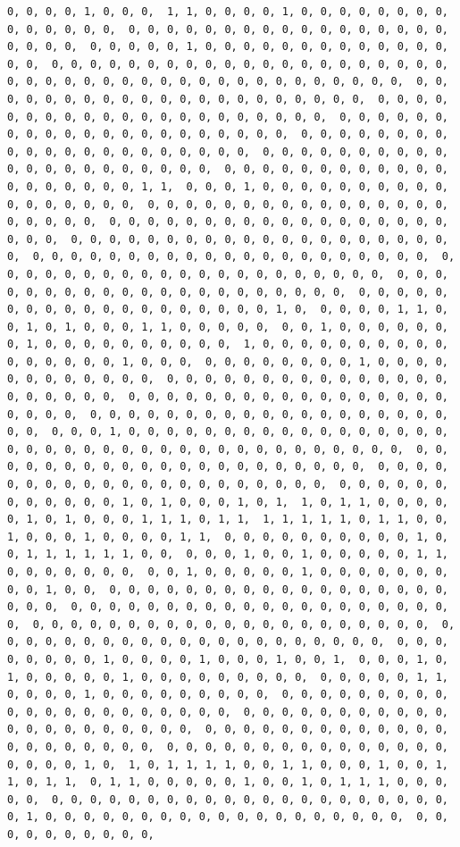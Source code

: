 \documentclass[
]{article}
\begin{document}
\begin{verbatim}
0, 0, 0, 0, 1, 0, 0, 0,  1, 1, 0, 0, 0, 0, 1, 0, 0, 0, 0, 0, 0, 0, 0, 0, 0, 0, 0, 0, 0,  0, 0, 0, 0, 0, 0, 0, 0, 0, 0, 0, 0, 0, 0, 0, 0, 0, 0, 0, 0, 0,  0, 0, 0, 0, 0, 1, 0, 0, 0, 0, 0, 0, 0, 0, 0, 0, 0, 0, 0, 0, 0,  0, 0, 0, 0, 0, 0, 0, 0, 0, 0, 0, 0, 0, 0, 0, 0, 0, 0, 0, 0, 0,  0, 0, 0, 0, 0, 0, 0, 0, 0, 0, 0, 0, 0, 0, 0, 0, 0, 0, 0, 0, 0,  0, 0, 0, 0, 0, 0, 0, 0, 0, 0, 0, 0, 0, 0, 0, 0, 0, 0, 0, 0, 0,  0, 0, 0, 0, 0, 0, 0, 0, 0, 0, 0, 0, 0, 0, 0, 0, 0, 0, 0, 0, 0,  0, 0, 0, 0, 0, 0, 0, 0, 0, 0, 0, 0, 0, 0, 0, 0, 0, 0, 0, 0, 0,  0, 0, 0, 0, 0, 0, 0, 0, 0, 0, 0, 0, 0, 0, 0, 0, 0, 0, 0, 0, 0,  0, 0, 0, 0, 0, 0, 0, 0, 0, 0, 0, 0, 0, 0, 0, 0, 0, 0, 0, 0, 0,  0, 0, 0, 0, 0, 0, 0, 0, 0, 0, 0, 0, 0, 0, 0, 0, 0, 0, 0, 1, 1,  0, 0, 0, 1, 0, 0, 0, 0, 0, 0, 0, 0, 0, 0, 0, 0, 0, 0, 0, 0, 0,  0, 0, 0, 0, 0, 0, 0, 0, 0, 0, 0, 0, 0, 0, 0, 0, 0, 0, 0, 0, 0,  0, 0, 0, 0, 0, 0, 0, 0, 0, 0, 0, 0, 0, 0, 0, 0, 0, 0, 0, 0, 0,  0, 0, 0, 0, 0, 0, 0, 0, 0, 0, 0, 0, 0, 0, 0, 0, 0, 0, 0, 0, 0,  0, 0, 0, 0, 0, 0, 0, 0, 0, 0, 0, 0, 0, 0, 0, 0, 0, 0, 0, 0, 0,  0, 0, 0, 0, 0, 0, 0, 0, 0, 0, 0, 0, 0, 0, 0, 0, 0, 0, 0, 0, 0,  0, 0, 0, 0, 0, 0, 0, 0, 0, 0, 0, 0, 0, 0, 0, 0, 0, 0, 0, 0, 0,  0, 0, 0, 0, 0, 0, 0, 0, 0, 0, 0, 0, 0, 0, 0, 0, 0, 0, 0, 1, 0,  0, 0, 0, 0, 1, 1, 0, 0, 1, 0, 1, 0, 0, 0, 1, 1, 0, 0, 0, 0, 0,  0, 0, 1, 0, 0, 0, 0, 0, 0, 0, 1, 0, 0, 0, 0, 0, 0, 0, 0, 0, 0,  1, 0, 0, 0, 0, 0, 0, 0, 0, 0, 0, 0, 0, 0, 0, 0, 0, 1, 0, 0, 0,  0, 0, 0, 0, 0, 0, 0, 0, 1, 0, 0, 0, 0, 0, 0, 0, 0, 0, 0, 0, 0,  0, 0, 0, 0, 0, 0, 0, 0, 0, 0, 0, 0, 0, 0, 0, 0, 0, 0, 0, 0, 0,  0, 0, 0, 0, 0, 0, 0, 0, 0, 0, 0, 0, 0, 0, 0, 0, 0, 0, 0, 0, 0,  0, 0, 0, 0, 0, 0, 0, 0, 0, 0, 0, 0, 0, 0, 0, 0, 0, 0, 0, 0, 0,  0, 0, 0, 1, 0, 0, 0, 0, 0, 0, 0, 0, 0, 0, 0, 0, 0, 0, 0, 0, 0,  0, 0, 0, 0, 0, 0, 0, 0, 0, 0, 0, 0, 0, 0, 0, 0, 0, 0, 0, 0, 0,  0, 0, 0, 0, 0, 0, 0, 0, 0, 0, 0, 0, 0, 0, 0, 0, 0, 0, 0, 0, 0,  0, 0, 0, 0, 0, 0, 0, 0, 0, 0, 0, 0, 0, 0, 0, 0, 0, 0, 0, 0, 0,  0, 0, 0, 0, 0, 0, 0, 0, 0, 0, 0, 0, 1, 0, 1, 0, 0, 0, 1, 0, 1,  1, 0, 1, 1, 0, 0, 0, 0, 0, 1, 0, 1, 0, 0, 0, 1, 1, 1, 0, 1, 1,  1, 1, 1, 1, 1, 0, 1, 1, 0, 0, 1, 0, 0, 0, 1, 0, 0, 0, 0, 1, 1,  0, 0, 0, 0, 0, 0, 0, 0, 0, 0, 1, 0, 0, 1, 1, 1, 1, 1, 1, 0, 0,  0, 0, 0, 1, 0, 0, 1, 0, 0, 0, 0, 0, 1, 1, 0, 0, 0, 0, 0, 0, 0,  0, 0, 1, 0, 0, 0, 0, 0, 1, 0, 0, 0, 0, 0, 0, 0, 0, 0, 1, 0, 0,  0, 0, 0, 0, 0, 0, 0, 0, 0, 0, 0, 0, 0, 0, 0, 0, 0, 0, 0, 0, 0,  0, 0, 0, 0, 0, 0, 0, 0, 0, 0, 0, 0, 0, 0, 0, 0, 0, 0, 0, 0, 0,  0, 0, 0, 0, 0, 0, 0, 0, 0, 0, 0, 0, 0, 0, 0, 0, 0, 0, 0, 0, 0,  0, 0, 0, 0, 0, 0, 0, 0, 0, 0, 0, 0, 0, 0, 0, 0, 0, 0, 0, 0, 0,  0, 0, 0, 0, 0, 0, 0, 0, 1, 0, 0, 0, 0, 1, 0, 0, 0, 1, 0, 0, 1,  0, 0, 0, 1, 0, 1, 0, 0, 0, 0, 0, 1, 0, 0, 0, 0, 0, 0, 0, 0, 0,  0, 0, 0, 0, 0, 1, 1, 0, 0, 0, 0, 1, 0, 0, 0, 0, 0, 0, 0, 0, 0,  0, 0, 0, 0, 0, 0, 0, 0, 0, 0, 0, 0, 0, 0, 0, 0, 0, 0, 0, 0, 0,  0, 0, 0, 0, 0, 0, 0, 0, 0, 0, 0, 0, 0, 0, 0, 0, 0, 0, 0, 0, 0,  0, 0, 0, 0, 0, 0, 0, 0, 0, 0, 0, 0, 0, 0, 0, 0, 0, 0, 0, 0, 0,  0, 0, 0, 0, 0, 0, 0, 0, 0, 0, 0, 0, 0, 0, 0, 0, 0, 0, 0, 1, 0,  1, 0, 1, 1, 1, 1, 0, 0, 1, 1, 0, 0, 0, 1, 0, 0, 1, 1, 0, 1, 1,  0, 1, 1, 0, 0, 0, 0, 0, 1, 0, 0, 1, 0, 1, 1, 1, 0, 0, 0, 0, 0,  0, 0, 0, 0, 0, 0, 0, 0, 0, 0, 0, 0, 0, 0, 0, 0, 0, 0, 0, 0, 0,  0, 1, 0, 0, 0, 0, 0, 0, 0, 0, 0, 0, 0, 0, 0, 0, 0, 0, 0, 0, 0,  0, 0, 0, 0, 0, 0, 0, 0, 0, 0, 
\end{verbatim}
\end{document}
